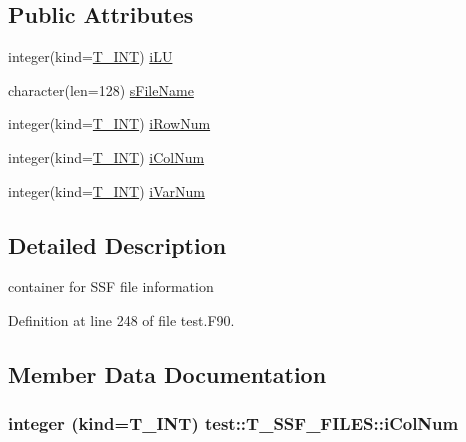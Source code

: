 \subsection*{Public Attributes}
\begin{DoxyCompactItemize}
\item 
integer(kind=\hyperlink{namespacetest_a6f91ebd89b58cfcc5da99faed9385c1e}{T\_\-INT}) \hyperlink{typetest_1_1_t___s_s_f___f_i_l_e_s_a75a178baf9a6812ad40701afe5c5d4ab}{iLU}
\item 
character(len=128) \hyperlink{typetest_1_1_t___s_s_f___f_i_l_e_s_ae3d105aa00d96de173e6e555b450915a}{sFileName}
\item 
integer(kind=\hyperlink{namespacetest_a6f91ebd89b58cfcc5da99faed9385c1e}{T\_\-INT}) \hyperlink{typetest_1_1_t___s_s_f___f_i_l_e_s_a401d7ac28f70b2b2058955f54ad4a7f3}{iRowNum}
\item 
integer(kind=\hyperlink{namespacetest_a6f91ebd89b58cfcc5da99faed9385c1e}{T\_\-INT}) \hyperlink{typetest_1_1_t___s_s_f___f_i_l_e_s_a60473acbc714e5f5470a553a4decdfa2}{iColNum}
\item 
integer(kind=\hyperlink{namespacetest_a6f91ebd89b58cfcc5da99faed9385c1e}{T\_\-INT}) \hyperlink{typetest_1_1_t___s_s_f___f_i_l_e_s_a53f02875290d171412f878a6d22527a9}{iVarNum}
\end{DoxyCompactItemize}


\subsection{Detailed Description}
container for SSF file information 

Definition at line 248 of file test.F90.



\subsection{Member Data Documentation}
\hypertarget{typetest_1_1_t___s_s_f___f_i_l_e_s_a60473acbc714e5f5470a553a4decdfa2}{
\subsubsection[{iColNum}]{\setlength{\rightskip}{0pt plus 5cm}integer (kind={\bf T\_\-INT}) {\bf test::T\_\-SSF\_\-FILES::iColNum}}}
\label{typetest_1_1_t___s_s_f___f_i_l_e_s_a60473acbc714e5f5470a553a4decdfa2}


